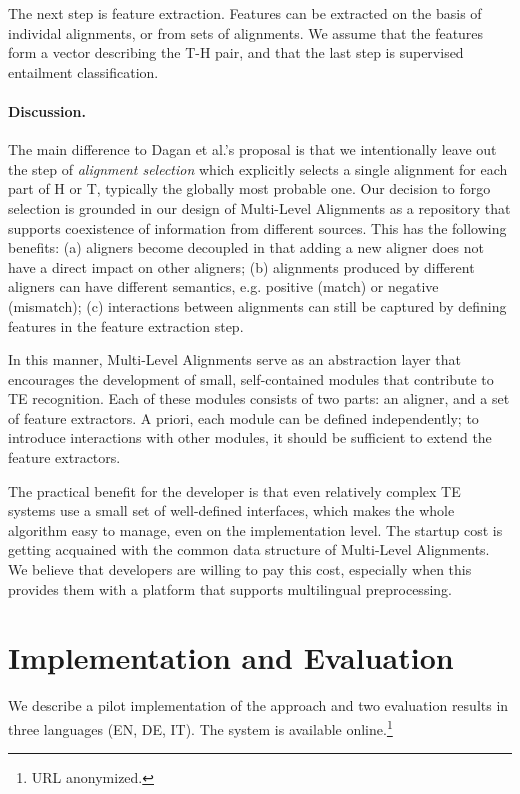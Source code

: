\documentclass[11pt,letterpaper]{article}
\begin{document}
The next step is feature extraction. Features can be extracted on the
basis of individal alignments, or from sets of alignments. We assume
that the features form a vector describing the T-H pair, and that the
last step is supervised entailment classification.

\paragraph{Discussion.} The main difference to Dagan et al.'s proposal
is that we intentionally leave out the step of {\em alignment
  selection} which explicitly selects a single alignment for each part
of H or T, typically the globally most probable one. Our decision to
forgo selection is grounded in our design of Multi-Level Alignments as
a repository that supports coexistence of information from different
sources. This has the following benefits: (a) aligners become
decoupled in that adding a new aligner does not have a direct impact
on other aligners; 
(b) alignments produced by different aligners
can have different semantics, e.g. positive (match) or negative
(mismatch); (c) interactions between alignments can still be captured
by defining features in the feature extraction step.

In this manner, Multi-Level Alignments serve as an abstraction layer
that encourages the development of small, self-contained modules that
contribute to TE recognition. Each of these modules consists of two
parts: an aligner, and a set of feature extractors. A priori, each
module can be defined independently; to introduce interactions with
other modules, it should be sufficient to extend the feature
extractors.

The practical benefit for the developer is that even relatively
complex TE systems use a small set of well-defined interfaces, which
makes the whole algorithm easy to manage, even on the implementation
level. The startup cost is getting acquained with the common data
structure of Multi-Level Alignments. We believe that developers are
willing to pay this cost, especially when this provides them with a
platform that supports multilingual preprocessing.

\section{Implementation and Evaluation}
\label{sec:impl}

We describe a pilot implementation of the approach and two evaluation
results in three languages (EN, DE, IT). The system is available
online.\footnote{{URL} anonymized.} 
\end{document}
